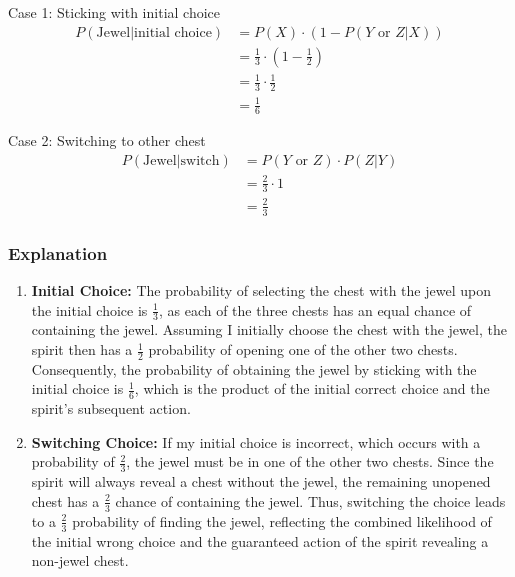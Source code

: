 \documentclass[a4paper, 10pt]{article}
\begin{document}
                \noindent Case 1: Sticking with initial choice
                \begin{align*}
                    P(\text{Jewel} | \text{initial choice}) &= P(X) \cdot \left(1 - P(Y \text{ or } Z | X)\right) \\
                    &= \frac{1}{3} \cdot \left(1 - \frac{1}{2}\right) \\
                    &= \frac{1}{3} \cdot \frac{1}{2} \\
                    &= \frac{1}{6}
                \end{align*}

                \noindent Case 2: Switching to other chest
                \begin{align*}
                    P(\text{Jewel} | \text{switch}) &= P(Y \text{ or } Z) \cdot P(Z | Y) \\
                    &= \frac{2}{3} \cdot 1 \\
                    &= \frac{2}{3}
                \end{align*}

            \subsubsection{Explanation}
                \begin{enumerate}
                    \item \textbf{Initial Choice:} The probability of selecting the chest with the jewel upon the initial choice is \( \frac{1}{3} \), as each of the three chests has an equal chance of containing the jewel. Assuming I initially choose the chest with the jewel, the spirit then has a \( \frac{1}{2} \) probability of opening one of the other two chests. Consequently, the probability of obtaining the jewel by sticking with the initial choice is \( \frac{1}{6} \), which is the product of the initial correct choice and the spirit's subsequent action.

                    \item \textbf{Switching Choice:} If my initial choice is incorrect, which occurs with a probability of \( \frac{2}{3} \), the jewel must be in one of the other two chests. Since the spirit will always reveal a chest without the jewel, the remaining unopened chest has a \( \frac{2}{3} \) chance of containing the jewel. Thus, switching the choice leads to a \( \frac{2}{3} \) probability of finding the jewel, reflecting the combined likelihood of the initial wrong choice and the guaranteed action of the spirit revealing a non-jewel chest.
                \end{enumerate}
\end{document}
